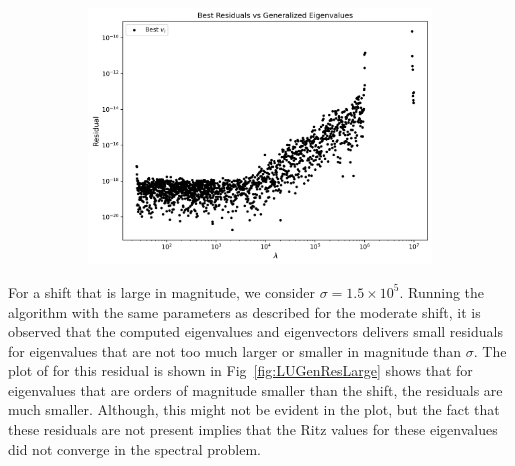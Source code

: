 \begin{figure}
	\begin{subfigure}{.5\textwidth}
		\centering
		\includegraphics[width=.8\linewidth]{./Plots/LU/residual_lu_bs.png}
		\caption{}
		\label{fig:LUBestResModerate}
	\end{subfigure}
\end{figure}


For a shift that is large in magnitude, we consider $\sigma = 1.5 \times 10^5$. Running the algorithm with the same parameters as described for the moderate shift, it is observed that the computed eigenvalues and eigenvectors delivers small residuals for eigenvalues that are not too much larger or smaller in magnitude than $\sigma$. The plot of for this residual is shown in Fig~\ref{fig:LUGenResLarge} shows that for eigenvalues that are orders of magnitude smaller than the shift, the residuals are much smaller. Although, this might not be evident in the plot, but the fact that these residuals are not present implies that the Ritz values for these eigenvalues did not converge in the spectral problem. 

